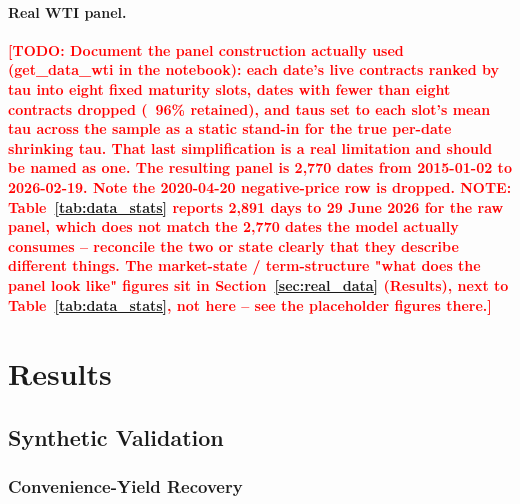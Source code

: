 \documentclass[11pt, a4paper]{article}
\newcommand{\todo}[1]{\textcolor{red}{\textbf{[TODO: #1]}}}
\begin{document}
\paragraph{Real WTI panel.}
\todo{Document the panel construction actually used (get\_data\_wti in the
  notebook): each date's live contracts ranked by tau into eight fixed maturity
  slots, dates with fewer than eight contracts dropped (~96\% retained), and
  taus set to each slot's mean tau across the sample as a static stand-in for
  the true per-date shrinking tau. That last simplification is a real limitation
  and should be named as one. The resulting panel is 2,770 dates from
  2015-01-02 to 2026-02-19. Note the 2020-04-20 negative-price row is dropped.
  NOTE: Table~\ref{tab:data_stats} reports 2,891 days to 29 June 2026 for the
  raw panel, which does not match the 2,770 dates the model actually consumes --
  reconcile the two or state clearly that they describe different things.
  The market-state / term-structure "what does the panel look like" figures
  sit in Section~\ref{sec:real_data} (Results), next to Table~\ref{tab:data_stats},
  not here -- see the placeholder figures there.}



\clearpage
\section{Results}
\label{sec:results}

\subsection{Synthetic Validation}
\label{sec:synthetic}

\subsubsection{Convenience-Yield Recovery}
\label{sec:synthetic_recovery}

\end{document}
